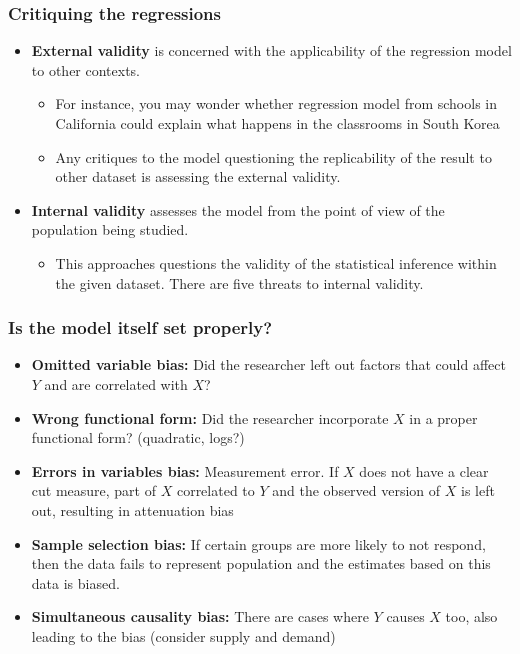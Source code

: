 \documentclass[aspectratio=169]{beamer}
\begin{document}
\begin{frame}
\frametitle{Critiquing the regressions}
\begin{itemize}
\item \textbf{External validity} is concerned with the applicability of the regression model to other contexts. 
\begin{itemize}
\item For instance, you may wonder whether regression model from schools in California could explain what happens in the classrooms in South Korea
\item Any critiques to the model questioning the replicability of the  result to other dataset is assessing the external validity. 
\end{itemize}
\item \textbf{Internal validity} assesses the model from the point of view of the population being studied. 
\begin{itemize}
\item This approaches questions the validity of the statistical inference within the given dataset. There are five threats to internal validity.
\end{itemize}
\end{itemize}
\end{frame}

\begin{frame}
\frametitle{Is the model itself set properly?}
\begin{itemize}
\item \textbf{Omitted variable bias: } Did the researcher left out factors that could affect $Y$ and are correlated with $X$? 
\item \textbf{Wrong functional form: } Did the researcher incorporate $X$ in a proper functional form? (quadratic, logs?)
\item \textbf{Errors in variables bias: } Measurement error. If $X$ does not have a clear cut measure, part of $X$ correlated to $Y$ and the observed version of $X$ is left out, resulting in attenuation bias
\item \textbf{Sample selection bias: }  If certain groups are more likely to not respond, then the data fails to represent population and the estimates based on this data is biased.
\item \textbf{Simultaneous causality bias: } There are cases where $Y$ causes $X$ too, also leading to the bias (consider supply and demand)
\end{itemize}
\end{frame}
\end{document}
